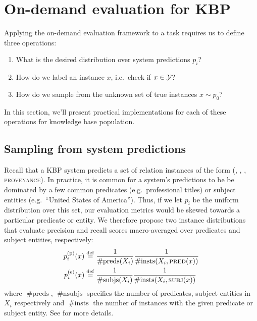 \section{On-demand evaluation for KBP}
\label{sec:application}
Applying the on-demand evaluation framework to a task requires us to define three operations:
\begin{enumerate}
  \item What is the desired distribution over system predictions $p_i$?
  \item How do we label an instance $x$, i.e.\ check if $x \in \mathcal{Y}$?
  \item How do we sample from the unknown set of true instances $x \sim p_0$?
\end{enumerate}
In this section, we'll present practical implementations for each of these operations for knowledge base population.

\subsection{Sampling from system predictions}
Recall that a KBP system predicts a set of relation instances of the form (, , , \textsc{provenance}).
In practice, it is common for a system's predictions
to be be dominated by a few common predicates (e.g.\ professional titles) or
subject entities (e.g.\ ``United States of America'').
Thus, if we let $p_i$ be the uniform distribution over this set,
our evaluation metrics would be skewed towards a particular predicate or entity.
We therefore propose two instance distributions that evaluate precision and recall scores macro-averaged over predicates and subject entities, respectively:
\begin{align*}
  p_i^\text{(p)}(x) &\stackrel{\rm def}{=} \frac{1}{\operatorname{\#preds}(X_i)} \frac{1}{\operatorname{\#insts}(X_i, {\textsc{pred}}(x))} \\
  p_i^\text{(e)}(x) &\stackrel{\rm def}{=} \frac{1}{\operatorname{\#subjs}(X_i)} \frac{1}{\operatorname{\#insts}(X_i, {\textsc{subj}}(x))}
\end{align*}
where $\operatorname{\#preds}$, $\operatorname{\#nsubjs}$ specifies the number of predicates, subject entities in $X_i$ respectively and $\operatorname{\#insts}$ the number of instances with the given predicate or subject entity.
See  for more details.

